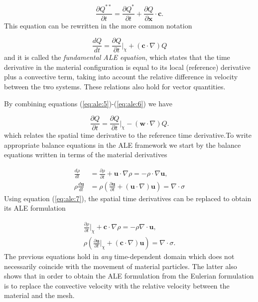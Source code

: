\documentclass[a4paper,11pt,oneside]{book}
\begin{document}
\begin{equation}
\frac{\partial Q^{**}}{\partial t} = \frac{\partial Q^{*}}{\partial t}
+ \frac{\partial Q}{\partial \mathbf{x}} \cdot \mathbf{c}.
\end{equation}
This equation can be rewritten in the more common notation

\begin{equation}
\label{eq:ale:5}
\frac{d Q}{d t} = \frac{\partial Q}{\partial t} {\Big |}_\chi + (\mathbf{c} \cdot \nabla) Q
\end{equation}
and it is called the \emph{fundamental ALE equation}, which states that the time derivative in the material configuration is equal to its local (reference) derivative plus a convective term, taking into account the relative difference in velocity between the two systems. These relations also hold for vector quantities.

By combining equations (\ref{eq:ale:5})-(\ref{eq:ale:6}) we have

\begin{equation}
\label{eq:ale:7}
\frac{\partial Q}{\partial t} = \frac{\partial Q}{\partial t} {\Big |}_\chi - (\mathbf{w} \cdot \nabla) Q.
\end{equation}
which relates the spatial time derivative to the reference time derivative.To write appropriate balance equations in the ALE framework we start by the balance equations written in terms of the material derivatives

\begin{align}
\frac{d \rho}{d t} &= \frac{\partial \rho}{\partial t} + \mathbf{u} \cdot \nabla \rho = - \rho \cdot \nabla \mathbf{u}, \\
\rho \frac{d \mathbf{u}}{d t} &= \rho (\frac{\partial \mathbf{u}}{\partial t} + (\mathbf{u} \cdot \nabla)\mathbf{u}) = \nabla \cdot \sigma
\end{align}
Using equation (\ref{eq:ale:7}), the spatial time derivatives can be replaced to obtain its ALE formulation

\begin{align}
\frac{\partial \rho}{\partial t} {\Big |}_\chi + \mathbf{c} \cdot \nabla \rho = - \rho \nabla \cdot \mathbf{u}, \\
\rho (\frac{\partial \mathbf{u}}{\partial t} {\Big |}_\chi + (\mathbf{c} \cdot \nabla)\mathbf{u}) = \nabla \cdot \sigma. 
\end{align}
The previous equations hold in \emph{any} time-dependent domain which does not necessarily coincide with the movement of material particles. The latter also shows that in order to obtain the ALE formulation from the Eulerian formulation is to replace the convective velocity with the relative velocity between the material and the mesh.
\end{document}
